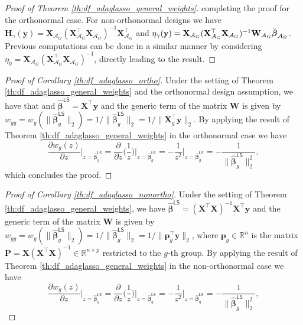 \documentclass[a4paper, 12pt]{article}
\newcommand{\Aset}{\mathcal{A}}
\newcommand{\T}{\top}
\def\bbeta{\boldsymbol{\beta}}
\def\bp{\boldsymbol{p}}
\def\by{\boldsymbol{y}}
\def\bH{\mathbf{H}}
\def\bP{\mathbf{P}}
\def\bW{\mathbf{W}}
\def\bX{\mathbf{X}}
\def\bp{\mathbf{p}}
\def\by{\mathbf{y}}
\begin{document}
\begin{appendix}
\begin{proof}[Proof of Theorem \ref{th:df_adaglasso_general_weights}]
completing the proof for the orthonormal case. For non-orthonormal designs we have $\bH_\gamma(\by)=\bX_{\Aset_G}(\bX_{\Aset_G}^{{\T}} \bX_{\Aset_G})^{-1} \bX_{\Aset_G}^{\T}$ and $
\eta_\gamma(\by)=\bX_{\Aset_G}(\bX_{\Aset_G}^{{\T}} \bX_{\Aset_G})^{-1} \bW_{\Aset_G}\Breve{\bbeta}_{\Aset_G}$. Previous computations can be done in a similar manner by considering $\eta_0 = \bX_{\Aset_G}(\bX_{\Aset_G}^{{\T}} \bX_{\Aset_G})^{-1}$, directly leading to the result.
\end{proof}
%
\begin{proof}[Proof of Corollary \ref{th:df_adaglasso_ortho}]
Under the setting of Theorem \ref{th:df_adaglasso_general_weights} and the orthonormal design assumption, we have that and $\widehat{\bbeta}^{\mathsf{LS}} = \bX^{\T} \by$ and the generic term of the matrix $\bW$ is given by $w_{gg} = w_g(\lVert\widehat{\bbeta}_g^\mathsf{LS}\rVert_2) =  1/\lVert\widehat{\bbeta}^{\mathsf{LS}}_g \rVert_2 =1/\lVert\bX_g^{\T} \by\rVert_2$. By applying the result of Theorem \ref{th:df_adaglasso_general_weights}
in the orthonormal case we have 
\begin{equation*}
\frac{\partial w_g(z)}{\partial z} \bigg|_{z=\widehat{\bbeta}_g^\mathsf{LS}} = \frac{\partial}{\partial z} \bigg( \frac{1}{z}\bigg)\bigg|_{z=\widehat{\bbeta}_g^\mathsf{LS}} =  - \frac{1}{z^2}\bigg|_{z=\widehat{\bbeta}_g^\mathsf{LS}} =  - \frac{1}{\lVert \widehat{\bbeta}_g^\mathsf{LS}\rVert_2^2},
\end{equation*}
which concludes the proof.
\end{proof}
%
\begin{proof}[Proof of Corollary \ref{th:df_adaglasso_nonortho}]
Under the setting of Theorem \ref{th:df_adaglasso_general_weights}, we have $\widehat{\bbeta}^{\mathsf{LS}} = (\bX^{\T}\bX)^{-1}\bX^{\T} \by$ and the generic term of the matrix $\bW$ is given by $w_{gg} = w_g(\lVert\widehat{\bbeta}_g^\mathsf{LS}\rVert_2) = 1/\lVert\widehat{\bbeta}^{\mathsf{LS}}_g\rVert_2 =1/\lVert\bp_g^{\T} \by\rVert_2$,
where $\bp_g\in\mathbb{R}^n$ is the matrix $\bP=\bX(\bX^{\T}\bX)^{-1}\in\mathbb{R}^{n\times p}$ restricted to the $g$-th group. By applying the result of Theorem \ref{th:df_adaglasso_general_weights} in the non-orthonormal case we have
\begin{equation*}
\frac{\partial w_g(z)}{\partial z} \bigg|_{z=\widehat{\bbeta}_g^\mathsf{LS}} = \frac{\partial}{\partial z} \bigg( \frac{1}{z}\bigg)\bigg|_{z=\widehat{\bbeta}_g^\mathsf{LS}} =  - \frac{1}{z^2}\bigg|_{z=\widehat{\bbeta}_g^\mathsf{LS}} =  - \frac{1}{\lVert\widehat{\bbeta}_g^\mathsf{LS}\rVert_2^2},

\end{equation*}
\end{proof}
\end{appendix}
\end{document}
